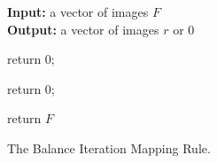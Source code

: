 \begin{algorithm}
\textbf{Input:} a vector of images $F$\\
\textbf{Output:} a vector of images $r$ or 0
\begin{algorithmic}[1]
{
{

{

{
\STATE return 0;
}\ENDIF

}\ENDIF

}\ENDFOR

{
\STATE return 0;
}\ENDIF

}\ENDFOR
\STATE return $F$\;
\medskip
\caption{The Balance Iteration Mapping Rule.}
\label{Chaotic iteration}
\end{algorithmic}
\end{algorithm}

% 
% 
% 
% 
% 
% 



